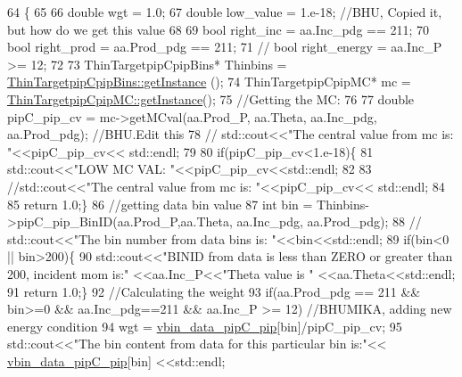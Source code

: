 \begin{DoxyCode}
64                                                                               \{
65 
66     \textcolor{keywordtype}{double} wgt = 1.0;
67     \textcolor{keywordtype}{double} low\_value = 1.e-18;     \textcolor{comment}{//BHU, Copied it, but how do we get this value}
68 
69     \textcolor{keywordtype}{bool} right\_inc = aa.Inc\_pdg == 211; 
70     \textcolor{keywordtype}{bool} right\_prod = aa.Prod\_pdg == 211;
71    \textcolor{comment}{// bool right\_energy = aa.Inc\_P >= 12;}
72    
73     ThinTargetpipCpipBins*  Thinbins =  \hyperlink{class_neutrino_flux_reweight_1_1_thin_targetpip_cpip_bins_aa9b4bec763ea562867a0d8ab9415f2c8}{ThinTargetpipCpipBins::getInstance}
      ();
74     ThinTargetpipCpipMC*  mc =  \hyperlink{class_neutrino_flux_reweight_1_1_thin_targetpip_cpip_m_c_aeeb5ad3ed4803b1122286f49d1897729}{ThinTargetpipCpipMC::getInstance}();
75    \textcolor{comment}{//Getting the MC:}
76 
77   \textcolor{keywordtype}{double} pipC\_pip\_cv = mc->getMCval(aa.Prod\_P, aa.Theta, aa.Inc\_pdg, aa.Prod\_pdg);    \textcolor{comment}{//BHU.Edit this}
78 \textcolor{comment}{//  std::cout<<"The central value from mc is: "<<pipC\_pip\_cv<< std::endl;}
79     
80   \textcolor{keywordflow}{if}(pipC\_pip\_cv<1.e-18)\{
81   std::cout<<\textcolor{stringliteral}{"LOW MC VAL: "}<<pipC\_pip\_cv<<std::endl;
82   
83   \textcolor{comment}{//std::cout<<"The central value from mc is: "<<pipC\_pip\_cv<< std::endl;}
84 
85   \textcolor{keywordflow}{return} 1.0;\}
86   \textcolor{comment}{//getting data bin value}
87     \textcolor{keywordtype}{int} bin      = Thinbins->pipC\_pip\_BinID(aa.Prod\_P,aa.Theta, aa.Inc\_pdg, aa.Prod\_pdg);
88   \textcolor{comment}{// std::cout<<"The bin number from data bins is: "<<bin<<std::endl;  }
89   \textcolor{keywordflow}{if}(bin<0 || bin>200)\{
90   std::cout<<\textcolor{stringliteral}{"BINID from data is less than ZERO or greater than 200, incident mom is:"} <<aa.Inc\_P<<\textcolor{stringliteral}{"Theta
       value is "} <<aa.Theta<<std::endl;
91      \textcolor{keywordflow}{return} 1.0;\}
92 \textcolor{comment}{//Calculating the weight}
93   \textcolor{keywordflow}{if}(aa.Prod\_pdg == 211 && bin>=0 && aa.Inc\_pdg==211 && aa.Inc\_P >= 12)     \textcolor{comment}{//BHUMIKA, adding new energy
       condition}
94     wgt = \hyperlink{class_neutrino_flux_reweight_1_1_thin_targetpip_cpip_reweighter_a163f6f641a9673db0d5d17abd9675c20}{vbin\_data\_pipC\_pip}[bin]/pipC\_pip\_cv;
95   std::cout<<\textcolor{stringliteral}{"The bin content from data for this particular bin is:"}<< 
      \hyperlink{class_neutrino_flux_reweight_1_1_thin_targetpip_cpip_reweighter_a163f6f641a9673db0d5d17abd9675c20}{vbin\_data\_pipC\_pip}[bin] <<std::endl;

\end{DoxyCode}
